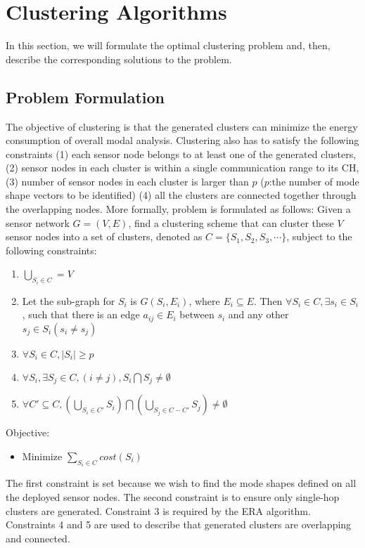 \section{Clustering Algorithms}
In this section, we will formulate the optimal clustering problem and, then, describe the corresponding solutions to the problem.

\subsection{Problem Formulation}
\label{sec:OptimalClustering}
The objective of clustering is that the generated clusters can minimize the energy consumption of overall modal analysis. Clustering also has to satisfy the following constraints (1) each sensor node belongs to at least one of the generated clusters, (2) sensor nodes in each cluster is within a single communication range to its CH, (3) number of sensor nodes in each cluster is larger than \(p\) (\(p\):the number of mode shape vectors to be identified) (4) all the clusters are connected together through the overlapping nodes. More formally, problem is formulated as follows:
Given a sensor network \(G=(V,E)\), find a clustering scheme that can cluster these \(V\) sensor nodes into a set of clusters, denoted as \(C=\{S_1, S_2, S_3, \cdots\}\), subject to the following constraints:
\begin{enumerate}
	\item \( \bigcup\limits_{S_i \in C} = V\)
	\item Let the sub-graph for \(S_i\) is \(G(S_i,E_i)\), where \(E_i \subseteq E\). Then \(\forall S_i \in C, \exists s_i \in S_i\), such that there is an edge \(a_{ij} \in E_i\) between \(s_i\) and any other \(s_j \in S_i (s_i \neq s_j)\) 
	\item \(\forall S_i \in C, \left|S_i\right|\geq p\)
	\item \( \forall S_i, \exists S_j \in C, (i \neq j), S_i \bigcap S_j \neq \emptyset\)
	\item \(\forall C' \subseteq C, (\bigcup\limits_{S_i \in C'} S_i)\bigcap (\bigcup\limits_{S_j \in C-C'} S_j) \neq \emptyset \)
\end{enumerate}
Objective:
\begin{itemize}
\item Minimize \(\sum\limits_{S_i \in C} cost(S_i)\)
\end{itemize}

The first constraint is set because we wish to find the mode shapes defined on all the deployed sensor nodes. The second constraint is to ensure only single-hop clusters are generated. Constraint 3 is required by the ERA algorithm. Constraints 4 and 5 are used to describe that generated clusters are overlapping and connected. 

